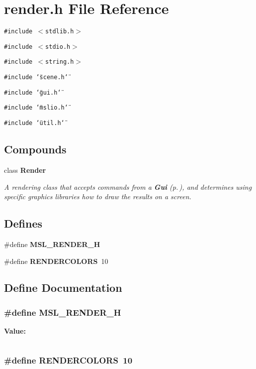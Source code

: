 \section{render.h File Reference}
\label{render_8h}
{\tt \#include $<$stdlib.h$>$}\par
{\tt \#include $<$stdio.h$>$}\par
{\tt \#include $<$string.h$>$}\par
{\tt \#include \char`\"{}scene.h\char`\"{}}\par
{\tt \#include \char`\"{}gui.h\char`\"{}}\par
{\tt \#include \char`\"{}mslio.h\char`\"{}}\par
{\tt \#include \char`\"{}util.h\char`\"{}}\par
\subsection*{Compounds}
\begin{CompactItemize}
\item 
class {\bf Render}
\begin{CompactList}\small\item\em A rendering class that accepts commands from a {\bf Gui} {\rm (p.\,\pageref{classGui})}, and determines using specific graphics libraries how to draw the results on a screen.\item\end{CompactList}\end{CompactItemize}
\subsection*{Defines}
\begin{CompactItemize}
\item 
\#define {\bf MSL\_\-RENDER\_\-H}
\item 
\#define {\bf RENDERCOLORS}\ 10
\end{CompactItemize}


\subsection{Define Documentation}
\subsubsection{\setlength{\rightskip}{0pt plus 5cm}\#define MSL\_\-RENDER\_\-H}\label{render_8h_a0}


{\bf Value:}\footnotesize\begin{verbatim}
\end{verbatim}\normalsize 
{}
\subsubsection{\setlength{\rightskip}{0pt plus 5cm}\#define RENDERCOLORS\ 10}\label{render_8h_a1}


